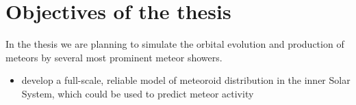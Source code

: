 \section{Objectives of the thesis} \label{iO}
    In the thesis we are planning to simulate the orbital evolution and production of meteors
    by several most prominent meteor showers.

    \begin{itemize}
        \item develop a full-scale, reliable model of meteoroid distribution in the inner Solar System,
            which could be used to predict meteor activity 
    \end{itemize}

